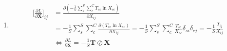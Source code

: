 \documentclass[11pt]{article}
\begin{document}
\begin{enumerate}[label=1\alph*]
\item
\begin{align*}
  {\Big[\frac{\partial L}{\partial \mathbf{X}}\Big]}_{ij} &=
                                              \frac{\partial(-\frac{1}{S}\sum_s^S\sum_c^C
                                              T_{sc}\ln X_{sc})}{\partial
                                              X_{ij}} \\
                                            &=
                                              -\frac{1}{S}\sum_s^S\sum_c^C
                                              \frac{\partial{(T_{sc}\ln
                                              X_{sc})}}{\partial X_{ij}} =
                                              -\frac{1}{S}\sum_s^S\sum_c^C
                                              \frac{T_{sc}}{X_{sc}}\delta_{si}\delta_{cj}
                                              =
                                              -\frac{1}{S}\frac{T_{ij}}{X_{ij}}\\
  &\Leftrightarrow \frac{\partial L}{\partial \mathbf{X}} = -\frac{1}{S}\mathbf{T} \oslash \mathbf{X}
\end{align*}
\end{enumerate}
\end{document}
